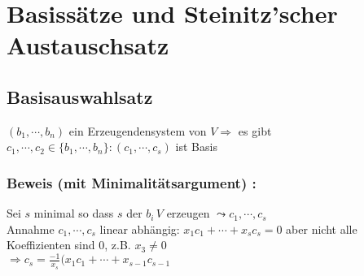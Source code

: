 \section{Basissätze und Steinitz'scher Austauschsatz}
%
%
%
\subsection{Basisauswahlsatz}
$(b_{1},\cdots, b_{n})$ ein Erzeugendensystem von $V \Rightarrow$  es gibt $c_{1},\cdots,c_{2} \in \{b_{1}, \cdots, b_{n}\}:(c_{1},\cdots,c_{s})$ ist Basis
%
%
%
\subsubsection{Beweis (mit Minimalitätsargument) :}
Sei $s$ minimal so dass $s$ der $b_{i} \, V$  erzeugen $ \leadsto c_{1},\cdots,c_{s}$\\
Annahme $c_{1},\cdots,c_{s}$ linear abhängig: $x_{1}c_{1}+\cdots+x_{s}c_{s} = 0$ aber nicht alle Koeffizienten sind $0$, z.B. $x_{3} \neq 0$\\
$\Rightarrow c_{s}=\frac{-1}{x_{s}}(x_{1}c_{1}+\cdots+x_{s-1}c_{s-1}$